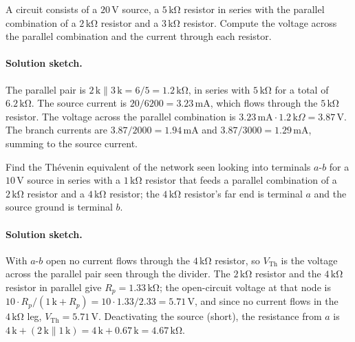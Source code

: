 \begin{exercise}
A circuit consists of a $20\,\si{\volt}$ source, a $5\,\si{\kilo\ohm}$
resistor in series with the parallel combination of a $2\,\si{\kilo
\ohm}$ resistor and a $3\,\si{\kilo\ohm}$ resistor. Compute the
voltage across the parallel combination and the current through each
resistor.
\paragraph{Solution sketch.}
The parallel pair is $2\,\text{k}\parallel 3\,\text{k} = 6/5 =
1.2\,\si{\kilo\ohm}$, in series with $5\,\si{\kilo\ohm}$ for a total of
$6.2\,\si{\kilo\ohm}$. The source current is $20/6200 = 3.23\,\si{
\milli\ampere}$, which flows through the $5\,\si{\kilo\ohm}$ resistor.
The voltage across the parallel combination is $3.23\,\text{mA}\cdot
1.2\,\text{k}\Omega = 3.87\,\si{\volt}$. The branch currents are
$3.87/2000 = 1.94\,\si{\milli\ampere}$ and $3.87/3000 = 1.29\,\si{
\milli\ampere}$, summing to the source current.
\end{exercise}

\begin{exercise}
Find the Th\'evenin equivalent of the network seen looking into
terminals $a$-$b$ for a $10\,\si{\volt}$ source in series with a
$1\,\si{\kilo\ohm}$ resistor that feeds a parallel combination of a
$2\,\si{\kilo\ohm}$ resistor and a $4\,\si{\kilo\ohm}$ resistor; the
$4\,\si{\kilo\ohm}$ resistor's far end is terminal $a$ and the source
ground is terminal $b$.
\paragraph{Solution sketch.}
With $a$-$b$ open no current flows through the $4\,\si{\kilo\ohm}$
resistor, so $V_{\text{Th}}$ is the voltage across the parallel pair
seen through the divider. The $2\,\si{\kilo\ohm}$ resistor and the
$4\,\si{\kilo\ohm}$ resistor in parallel give $R_{p} = 1.33\,\si{\kilo
\ohm}$; the open-circuit voltage at that node is $10\cdot R_{p}/(1\,
\text{k}+R_{p}) = 10\cdot 1.33/2.33 = 5.71\,\si{\volt}$, and since no
current flows in the $4\,\si{\kilo\ohm}$ leg, $V_{\text{Th}} =
5.71\,\si{\volt}$. Deactivating the source (short), the resistance from
$a$ is $4\,\text{k} + (2\,\text{k}\parallel 1\,\text{k}) = 4\,\text{k}+
0.67\,\text{k} = 4.67\,\si{\kilo\ohm}$.
\end{exercise}

